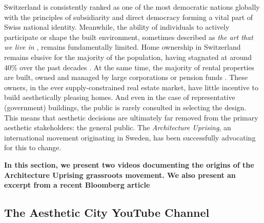 \documentclass[a4paper]{article}
\begin{document}
\begin{mdframed}[linewidth=1pt, roundcorner=5pt, innerleftmargin=10pt, innerrightmargin=10pt, innertopmargin=10pt, innerbottommargin=10pt, linecolor=black, backgroundcolor=white, userdefinedwidth=\textwidth]
    Switzerland is consistently ranked as one of the most democratic nations globally \cite{noauthor_economist_2023} with the principles of subsidiarity and direct democracy forming a vital part of Swiss national identity. Meanwhile, the ability of individuals to actively participate or shape the built environment, sometimes described as \textit{the art that we live in} \cite{hughes_shock_1980}, remains fundamentally limited. Home ownership in Switzerland remains elusive for the majority of the population, having stagnated at around 40\% over the past decades \cite{noauthor_home_2022}. At the same time, the majority of rental properties are built, owned and managed by large corporations or pension funds \cite{noauthor_wem_nodate}. These owners, in the ever supply-constrained real estate market, have little incentive to build aesthetically pleasing homes. And even in the case of representative (government) buildings, the public is rarely consulted in selecting the design. This means that aesthetic decisions are ultimately far removed from the primary aesthetic stakeholders: the general public. The \textit{Architecture Uprising}, an international movement originating in Sweden, has been successfully advocating for this to change.

    \textbf{In this section, we present two videos documenting the origins of the Architecture Uprising grassroots movement. We also present an excerpt from a recent Bloomberg article }
\end{mdframed}


\subsection{The Aesthetic City YouTube Channel}
\end{document}
